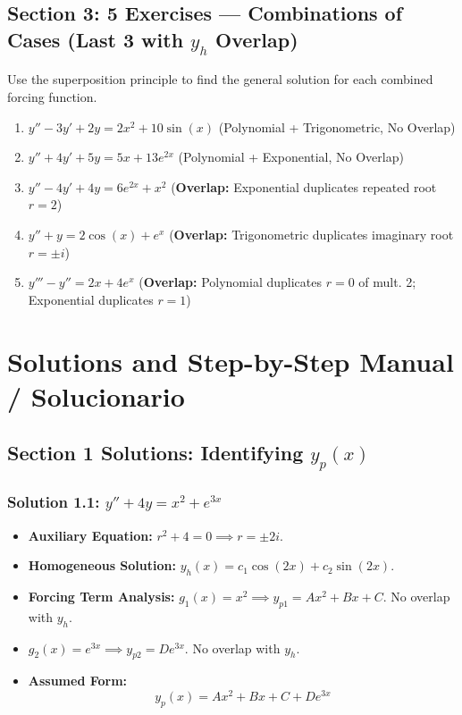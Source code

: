 \documentclass[11pt,letterpaper]{article}
\begin{document}
\subsection*{Section 3: 5 Exercises — Combinations of Cases (Last 3 with $y_h$ Overlap)}
Use the superposition principle to find the general solution for each combined forcing function.

\begin{enumerate}[label=\textbf{3.\arabic*}]
    \item $y'' - 3y' + 2y = 2x^2 + 10\sin(x)$ \quad (Polynomial + Trigonometric, No Overlap)
    \item $y'' + 4y' + 5y = 5x + 13e^{2x}$ \quad (Polynomial + Exponential, No Overlap)
    \item $y'' - 4y' + 4y = 6e^{2x} + x^2$ \quad (\textbf{Overlap:} Exponential duplicates repeated root $r=2$)
    \item $y'' + y = 2\cos(x) + e^x$ \quad (\textbf{Overlap:} Trigonometric duplicates imaginary root $r=\pm i$)
    \item $y''' - y'' = 2x + 4e^x$ \quad (\textbf{Overlap:} Polynomial duplicates $r=0$ of mult. 2; Exponential duplicates $r=1$)
\end{enumerate}

\newpage
\section{Solutions and Step-by-Step Manual / Solucionario}

\subsection*{Section 1 Solutions: Identifying $y_p(x)$}

\subsubsection*{Solution 1.1: $y'' + 4y = x^2 + e^{3x}$}
\begin{itemize}
    \item \textbf{Auxiliary Equation:} $r^2 + 4 = 0 \implies r = \pm 2i$.
    \item \textbf{Homogeneous Solution:} $y_h(x) = c_1 \cos(2x) + c_2 \sin(2x)$.
    \item \textbf{Forcing Term Analysis:} $g_1(x) = x^2 \implies y_{p1} = A x^2 + B x + C$. No overlap with $y_h$.
    \item $g_2(x) = e^{3x} \implies y_{p2} = D e^{3x}$. No overlap with $y_h$.
    \item \textbf{Assumed Form:}
    \[ y_p(x) = A x^2 + B x + C + D e^{3x} \]
\end{itemize}
\end{document}
